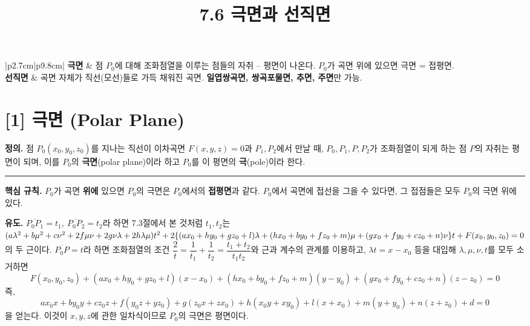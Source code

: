 \documentclass{article}
\title{7.6 극면과 선직면}
\date{}
\author{}
\theoremstyle{mystyle}
\begin{document}
\maketitle

\begin{tcolorbox}[colback=blue!5, colframe=blue!60!black, title=7.6 극면과 선직면 -- 한눈에 보기, boxrule=0.5mm, arc=3mm]
\begin{center}
\renewcommand{\arraystretch}{1.3}
\begin{tabular}{|p{2.7cm}|p{9.8cm}|}
\hline
\textbf{극면} & 점 \(P_0\)에 대해 조화점열을 이루는 점들의 자취 -- 평면이 나온다. \(P_0\)가 곡면 위에 있으면 극면 = 접평면. \\
\hline
\textbf{선직면} & 곡면 자체가 직선(모선)들로 가득 채워진 곡면. \textbf{일엽쌍곡면, 쌍곡포물면, 추면, 주면}만 가능. \\
\hline
\end{tabular}
\end{center}
\end{tcolorbox}

\section*{[1] 극면 (Polar Plane)}

\begin{tcolorbox}[
    colback=teal!4,
    colframe=teal!65!black,
    title=정의 \& 핵심 규칙,
    fonttitle=\bfseries,
    boxrule=0.5mm,
    arc=3mm
    ]
    \textbf{\textcolor{teal!65!black}{정의.}}\quad
    점 \(P_0(x_0,y_0,z_0)\)를 지나는 직선이 이차곡면 \(F(x,y,z)=0\)과 \(P_1,P_2\)에서 만날 때, \(P_0,P_1,P,P_2\)가 조화점열이 되게 하는 점 \(P\)의 자취는 평면이 되며, 이를 \(P_0\)의 \textbf{극면}(polar plane)이라 하고 \(P_0\)를 이 평면의 \textbf{극}(pole)이라 한다.

    \noindent\textcolor{teal!50!black}{\rule{\linewidth}{0.4pt}}

    \textbf{\textcolor{teal!65!black}{핵심 규칙.}}\quad
    \(P_0\)가 곡면 \textbf{위에} 있으면 \(P_0\)의 극면은 \(P_0\)에서의 \textbf{접평면}과 같다. \(P_0\)에서 곡면에 접선을 그을 수 있다면, 그 접점들은 모두 \(P_0\)의 극면 위에 있다.
\end{tcolorbox}

\textbf{유도.} \(\overline{P_0P_1}=t_1,\ \overline{P_0P_2}=t_2\)라 하면 7.3절에서 본 것처럼 \(t_1,t_2\)는\\
$
(a\lambda^2+b\mu^2+c\nu^2+2f\mu\nu+2g\nu\lambda+2h\lambda\mu)t^2\\
+2\{(ax_0+hy_0+gz_0+l)\lambda+(hx_0+by_0+fz_0+m)\mu+(gx_0+fy_0+cz_0+n)\nu\}t\\
+F(x_0,y_0,z_0)=0
$ \\
의 두 근이다. \(\overline{P_0P}=t\)라 하면 조화점열의 조건 \(\dfrac{2}{t}=\dfrac{1}{t_1}+\dfrac{1}{t_2}=\dfrac{t_1+t_2}{t_1t_2}\)와 근과 계수의 관계를 이용하고, \(\lambda t=x-x_0\) 등을 대입해 \(\lambda,\mu,\nu,t\)를 모두 소거하면
\[
F(x_0,y_0,z_0)+(ax_0+hy_0+gz_0+l)(x-x_0)+(hx_0+by_0+fz_0+m)(y-y_0)+(gx_0+fy_0+cz_0+n)(z-z_0)=0
\]
즉,
\[
ax_0x+by_0y+cz_0z+f(y_0z+yz_0)+g(z_0x+zx_0)+h(x_0y+xy_0)+l(x+x_0)+m(y+y_0)+n(z+z_0)+d=0
\]
을 얻는다. 이것이 \(x,y,z\)에 관한 일차식이므로 \(P_0\)의 극면은 평면이다.
\end{document}
